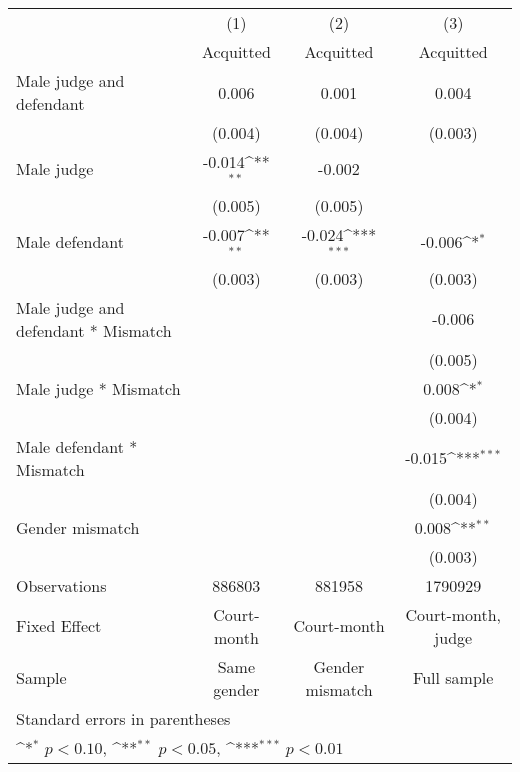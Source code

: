 {
\def\sym#1{\ifmmode^{#1}\else\(^{#1}\)\fi}
\begin{tabular}{l*{3}{c}}
\hline\hline
                    &\multicolumn{1}{c}{(1)}&\multicolumn{1}{c}{(2)}&\multicolumn{1}{c}{(3)}\\
                    &\multicolumn{1}{c}{Acquitted}&\multicolumn{1}{c}{Acquitted}&\multicolumn{1}{c}{Acquitted}\\
\hline
Male judge and defendant&       0.006         &       0.001         &       0.004         \\
                    &     (0.004)         &     (0.004)         &     (0.003)         \\
[1em]
Male judge          &      -0.014\sym{**} &      -0.002         &                     \\
                    &     (0.005)         &     (0.005)         &                     \\
[1em]
Male defendant      &      -0.007\sym{**} &      -0.024\sym{***}&      -0.006\sym{*}  \\
                    &     (0.003)         &     (0.003)         &     (0.003)         \\
[1em]
Male judge and defendant * Mismatch&                     &                     &      -0.006         \\
                    &                     &                     &     (0.005)         \\
[1em]
Male judge * Mismatch&                     &                     &       0.008\sym{*}  \\
                    &                     &                     &     (0.004)         \\
[1em]
Male defendant * Mismatch&                     &                     &      -0.015\sym{***}\\
                    &                     &                     &     (0.004)         \\
[1em]
Gender mismatch     &                     &                     &       0.008\sym{**} \\
                    &                     &                     &     (0.003)         \\
\hline
Observations        &      886803         &      881958         &     1790929         \\
Fixed Effect        & Court-month         & Court-month         &Court-month, judge         \\
Sample              & Same gender         &Gender mismatch         & Full sample         \\
\hline\hline
\multicolumn{4}{l}{\footnotesize Standard errors in parentheses}\\
\multicolumn{4}{l}{\footnotesize \sym{*} \(p<0.10\), \sym{**} \(p<0.05\), \sym{***} \(p<0.01\)}\\
\end{tabular}
}
